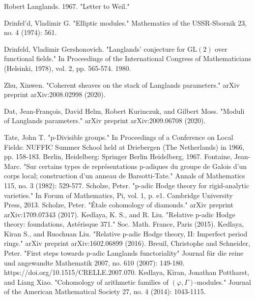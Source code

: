 \documentclass[12pt]{book}
\theoremstyle{definition}
\begin{document}
\begin{thebibliography}{}
 Robert Langlands. 1967. "Letter to Weil."

 Drinfel'd, Vladimir G. "Elliptic modules." Mathematics of the USSR-Sbornik 23, no. 4 (1974): 561.

 Drinfeld, Vladimir Gershonovich. "Langlands' conjecture for $\mathrm{GL}(2)$ over functional fields." In Proceedings of the International Congress of Mathematicians (Helsinki, 1978), vol. 2, pp. 565-574. 1980.

 Zhu, Xinwen. "Coherent sheaves on the stack of Langlands parameters." arXiv preprint arXiv:2008.02998 (2020).

 Dat, Jean-Fran\c{c}ois, David Helm, Robert Kurinczuk, and Gilbert Moss. "Moduli of Langlands parameters." arXiv preprint arXiv:2009.06708 (2020).


 Tate, John T. "p-Divisible groups." In Proceedings of a Conference on Local Fields: NUFFIC Summer School held at Driebergen (The Netherlands) in 1966, pp. 158-183. Berlin, Heidelberg: Springer Berlin Heidelberg, 1967.
 Fontaine, Jean-Marc. "Sur certains types de repr\'esentations p-adiques du groupe de Galois d'un corps local; construction d'un anneau de Barsotti-Tate." Annals of Mathematics 115, no. 3 (1982): 529-577.
 Scholze, Peter. "p-adic Hodge theory for rigid-analytic varieties." In Forum of Mathematics, Pi, vol. 1, p. e1. Cambridge University Press, 2013.
 Scholze, Peter. "\'Etale cohomology of diamonds." arXiv preprint arXiv:1709.07343 (2017).
 Kedlaya, K. S., and R. Liu. "Relative p-adic Hodge theory: foundations, Ast\'erisque 371." Soc. Math. France, Paris (2015).
 Kedlaya, Kiran S., and Ruochuan Liu. "Relative p-adic Hodge theory, II: Imperfect period rings." arXiv preprint arXiv:1602.06899 (2016).
 Breuil, Christophe and Schneider, Peter. "First steps towards p-adic Langlands functoriality" Journal f\"ur die reine und angewandte Mathematik 2007, no. 610 (2007): 149-180. https://doi.org/10.1515/CRELLE.2007.070.
 Kedlaya, Kiran, Jonathan Pottharst, and Liang Xiao. "Cohomology of arithmetic families of $(\varphi, \Gamma)$-modules." Journal of the American Mathematical Society 27, no. 4 (2014): 1043-1115.




\end{thebibliography}
\end{document}
